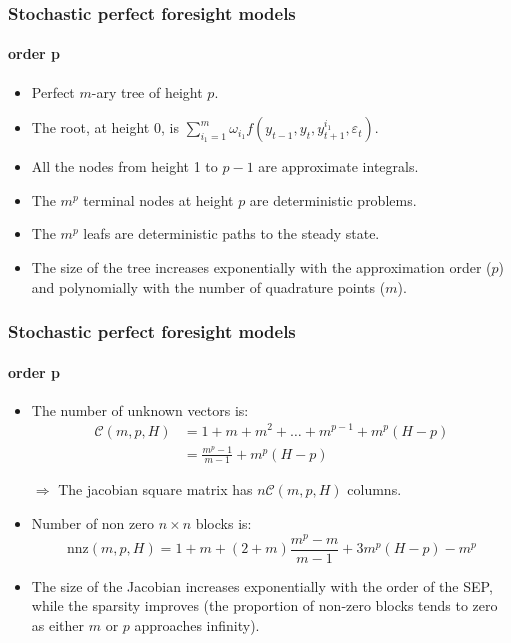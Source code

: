 \documentclass{beamer}
\begin{document}
\begin{frame}%
  \frametitle{Stochastic perfect foresight models}
  \framesubtitle{order p}

\begin{itemize}

  \item Perfect $m$-ary tree of height $p$.\newline

  \item The root, at height 0, is $\sum_{i_1=1}^m \omega_{i_1}f\left(y_{t-1}, y_t, y_{t+1}^{i_1}, \varepsilon_t \right)$.\newline

  \item All the nodes from height 1 to $p-1$ are approximate integrals.\newline

  \item The $m^p$ terminal nodes at height $p$ are deterministic problems.\newline

  \item The $m^p$ leafs are deterministic paths to the steady state.\newline

  \item The size of the tree increases exponentially with the approximation order ($p$) and polynomially with the number of quadrature points ($m$).

\end{itemize}

\end{frame}


\begin{frame}%
  \frametitle{Stochastic perfect foresight models}
  \framesubtitle{order p}

\begin{itemize}

  \item The number of unknown vectors is:
\[
  \begin{split}
    \mathcal C(m,p,H) &= 1+m+m^2+\ldots+m^{p-1} + m^p(H-p)\\
                  &= \frac{m^p-1}{m-1} + m^p(H-p)
  \end{split}
\]

\item[$\Rightarrow$] The jacobian square matrix has $n\mathcal C(m,p,H)$ columns.\newline

\item Number of non zero $n\times n$ blocks is:
\[
    \mathrm{nnz}(m,p,H) = 1+m+(2+m)\frac{m^p-m}{m-1}+3m^p(H-p)-m^p
  \]

\item The size of the Jacobian increases exponentially with the order
 of the SEP, while the sparsity improves (the proportion of non-zero blocks tends to zero as either $m$ or $p$ approaches infinity).

\end{itemize}

\end{frame}
\end{document}
